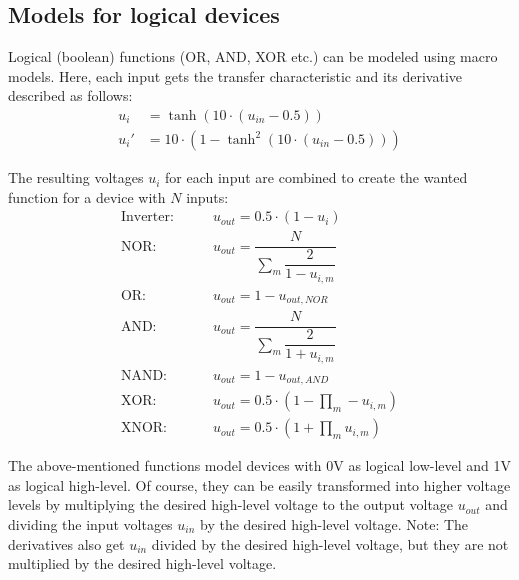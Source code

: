 \subsection{Models for logical devices}
\label{sec:DClogic}

Logical (boolean) functions (OR, AND, XOR etc.) can be modeled using
macro models.  Here, each input gets the transfer characteristic and
its derivative described as follows:
\begin{align}
u_i  & = \tanh (10\cdot (u_{in} - 0.5)) \\
u_i' & = 10\cdot \left( 1- \tanh^2 (10\cdot (u_{in} - 0.5)) \right)
\end{align}

The resulting voltages $u_i$ for each input are combined to create
the wanted function for a device with $N$ inputs:
\begin{align}
\label{eq:logout1}
\text{Inverter:} \qquad & u_{out} = 0.5\cdot(1 - u_i) \\
\text{NOR:}      \qquad & u_{out} = \dfrac{N}{\sum\limits_m \dfrac{2}{1 - u_{i,m}}} \\
\text{OR:}       \qquad & u_{out} = 1 - u_{out,NOR} \\
\text{AND:}      \qquad & u_{out} = \dfrac{N}{\sum\limits_m \dfrac{2}{1 + u_{i,m}}} \\
\text{NAND:}     \qquad & u_{out} = 1 - u_{out,AND} \\
\text{XOR:}      \qquad & u_{out} = 0.5\cdot\left( 1 - \prod_m -u_{i,m} \right) \\
\label{eq:logout2}
\text{XNOR:}     \qquad & u_{out} = 0.5\cdot\left( 1 + \prod_m u_{i,m} \right)
\end{align}

The above-mentioned functions model devices with 0V as logical
low-level and 1V as logical high-level.  Of course, they can be easily
transformed into higher voltage levels by multiplying the desired
high-level voltage to the output voltage $u_{out}$ and dividing the
input voltages $u_{in}$ by the desired high-level voltage.  Note: The
derivatives also get $u_{in}$ divided by the desired high-level
voltage, but they are not multiplied by the desired high-level
voltage.

\addvspace{12pt}

